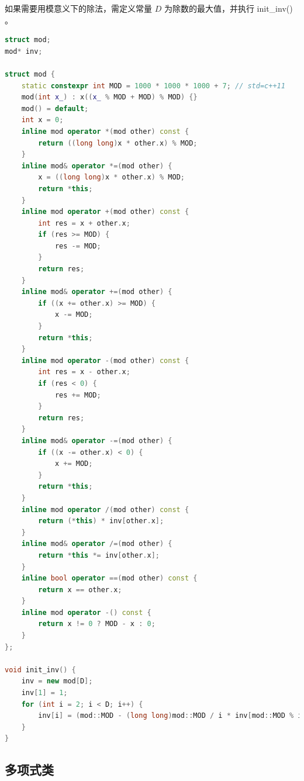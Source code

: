 \documentclass{article}
\begin{document}
如果需要用模意义下的除法，需定义常量 $D$ 为除数的最大值，并执行 init\_inv() 。

\begin{lstlisting}[language=C++]
struct mod;
mod* inv;

struct mod {
	static constexpr int MOD = 1000 * 1000 * 1000 + 7; // std=c++11
	mod(int x_) : x((x_ % MOD + MOD) % MOD) {}
	mod() = default;
	int x = 0;
	inline mod operator *(mod other) const {
		return ((long long)x * other.x) % MOD;
	}
	inline mod& operator *=(mod other) {
		x = ((long long)x * other.x) % MOD;
		return *this;
	}
	inline mod operator +(mod other) const {
		int res = x + other.x;
		if (res >= MOD) {
			res -= MOD;
		}
		return res;
	}
	inline mod& operator +=(mod other) {
		if ((x += other.x) >= MOD) {
			x -= MOD;
		}
		return *this;
	}
	inline mod operator -(mod other) const {
		int res = x - other.x;
		if (res < 0) {
			res += MOD;
		}
		return res;
	}
	inline mod& operator -=(mod other) {
		if ((x -= other.x) < 0) {
			x += MOD;
		}
		return *this;
	}
	inline mod operator /(mod other) const {
		return (*this) * inv[other.x];
	}
	inline mod& operator /=(mod other) {
		return *this *= inv[other.x];
	}
	inline bool operator ==(mod other) const {
		return x == other.x;
	}
	inline mod operator -() const {
		return x != 0 ? MOD - x : 0;
	}
};

void init_inv() {
	inv = new mod[D];
	inv[1] = 1;
	for (int i = 2; i < D; i++) {
		inv[i] = (mod::MOD - (long long)mod::MOD / i * inv[mod::MOD % i].x % mod::MOD) % mod::MOD;
	}
}
\end{lstlisting}

\subsection{多项式类}
\end{document}

